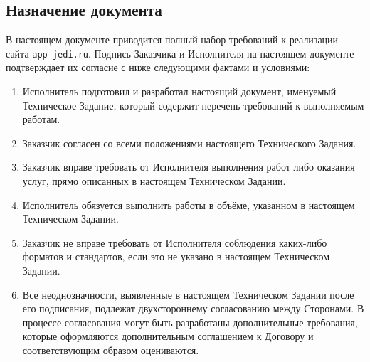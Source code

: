 \subsection{Назначение документа}
В настоящем документе приводится полный набор требований к реализации сайта \texttt{app-jedi.ru}.
Подпись Заказчика и Исполнителя на настоящем документе подтверждает их согласие с ниже следующими фактами и условиями:
\begin{enumerate}
  \item Исполнитель подготовил и разработал настоящий документ, именуемый Техническое Задание, который содержит перечень требований к выполняемым работам.
  \item Заказчик согласен со всеми положениями настоящего Технического Задания.
  \item Заказчик вправе требовать от Исполнителя выполнения работ либо оказания услуг, прямо описанных в настоящем Техническом Задании.
  \item Исполнитель обязуется выполнить работы в объёме, указанном в настоящем Техническом Задании.
  \item Заказчик не вправе требовать от Исполнителя соблюдения каких-либо форматов и стандартов, если это не указано в настоящем Техническом Задании.
  \item Все неоднозначности, выявленные в настоящем Техническом Задании после его подписания, подлежат двухстороннему согласованию между Сторонами. В процессе согласования могут быть разработаны дополнительные требования, которые оформляются дополнительным соглашением к Договору и соответствующим образом оцениваются.
\end{enumerate}
